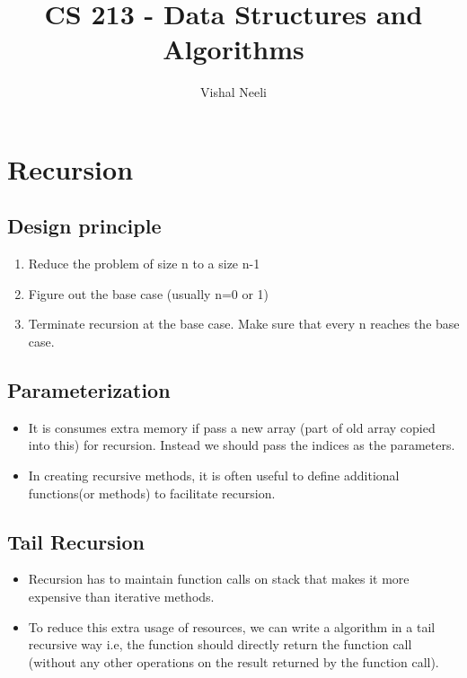 \documentclass{article}
\title{CS 213 - Data Structures and Algorithms}
\author{Vishal Neeli}
\date{}
\begin{document}
\maketitle

\section{Recursion}

	\subsection{Design principle}
	\begin{enumerate}
		\item Reduce the problem of size n to a size n-1
		\item Figure out the base case (usually n=0 or 1)
		\item Terminate recursion at the base case. Make sure that every n reaches the base case.

	\end{enumerate}

	\subsection{Parameterization}
	\begin{itemize}
		\item It is consumes extra memory if pass a new array (part of old array copied into this) for recursion. Instead we should pass the indices as the parameters.
		\item In creating recursive methods, it is often useful to define additional functions(or methods) to facilitate recursion.

	\end{itemize}

	\subsection{Tail Recursion}
	\begin{itemize}
		\item Recursion has to maintain function calls on stack that makes it more expensive than iterative methods.
		\item To reduce this extra usage of resources, we can write a algorithm in a tail recursive way i.e, the function should directly return the function call (without any other operations on the result returned by the function call).
	\end{itemize}
\end{document}
